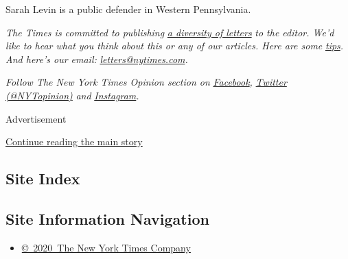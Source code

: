 Sarah Levin is a public defender in Western Pennsylvania.

\emph{The Times is committed to publishing}
\href{https://www.nytimes.com/2019/01/31/opinion/letters/letters-to-editor-new-york-times-women.html}{\emph{a
diversity of letters}} \emph{to the editor. We'd like to hear what you
think about this or any of our articles. Here are some}
\href{https://help.nytimes.com/hc/en-us/articles/115014925288-How-to-submit-a-letter-to-the-editor}{\emph{tips}}\emph{.
And here's our email:}
\href{mailto:letters@nytimes.com}{\emph{letters@nytimes.com}}\emph{.}

\emph{Follow The New York Times Opinion section on}
\href{https://www.facebook.com/nytopinion}{\emph{Facebook}}\emph{,}
\href{http://twitter.com/NYTOpinion}{\emph{Twitter (@NYTopinion)}}
\emph{and}
\href{https://www.instagram.com/nytopinion/}{\emph{Instagram}}\emph{.}

Advertisement

\protect\hyperlink{after-bottom}{Continue reading the main story}

\hypertarget{site-index}{%
\subsection{Site Index}\label{site-index}}

\hypertarget{site-information-navigation}{%
\subsection{Site Information
Navigation}\label{site-information-navigation}}

\begin{itemize}
\tightlist
\item
  \href{https://help.nytimes.com/hc/en-us/articles/115014792127-Copyright-notice}{©~2020~The
  New York Times Company}
\end{itemize}

